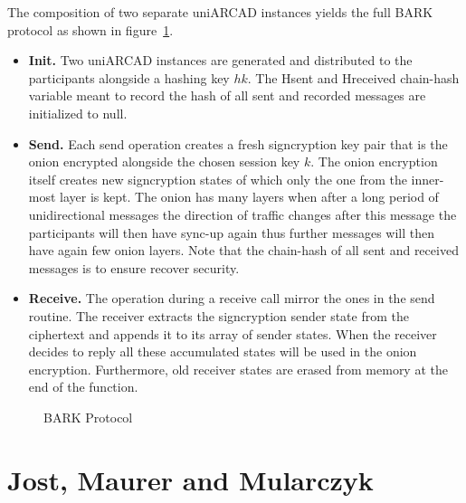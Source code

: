 \documentclass[11pt,a4paper,twoside,openright,bibliography=totoc]{scrbook}
\begin{document}
The composition of two separate uniARCAD instances yields
the full BARK protocol as shown in figure~\ref{fig:bark}.
\begin{itemize}
\item \textbf{Init.} Two uniARCAD instances are generated and
  distributed to the participants alongside a hashing key $hk$.
  The Hsent and Hreceived chain-hash variable meant to record
  the hash of all sent and recorded messages are initialized
  to null.
\item \textbf{Send.} Each send operation creates a fresh
  signcryption key pair that is the onion encrypted alongside
  the chosen session key $k$. The onion encryption itself
  creates new signcryption states of which only the one from
  the inner-most layer is kept. The onion has many layers when
  after a long period of unidirectional messages the direction
  of traffic changes after this message the participants will
  then have sync-up again thus further messages will then
  have again few onion layers. Note that the chain-hash
  of all sent and received messages is to ensure recover security.
\item \textbf{Receive.} The operation during a receive call
  mirror the ones in the send routine. The receiver extracts
  the signcryption sender state from the ciphertext and appends
  it to its array of sender states. When the receiver decides
  to reply all these accumulated states will be used in the
  onion encryption. Furthermore, old receiver states are
  erased from memory at the end of the function.
\end{itemize}

\begin{figure}[p]
  \centering
  \setlength{\fboxsep}{10pt}
  \scalebox{0.9}{%
    \fbox{%
      
    } 
  }
  \caption{BARK Protocol}
  \label{fig:bark}
\end{figure}

\clearpage

\section[Jost, Maurer and Mularczyk]
{Jost, Maurer and Mularczyk~\cite{jostefficient}}
\label{sec:jost-maur-mularczyk}
\end{document}
